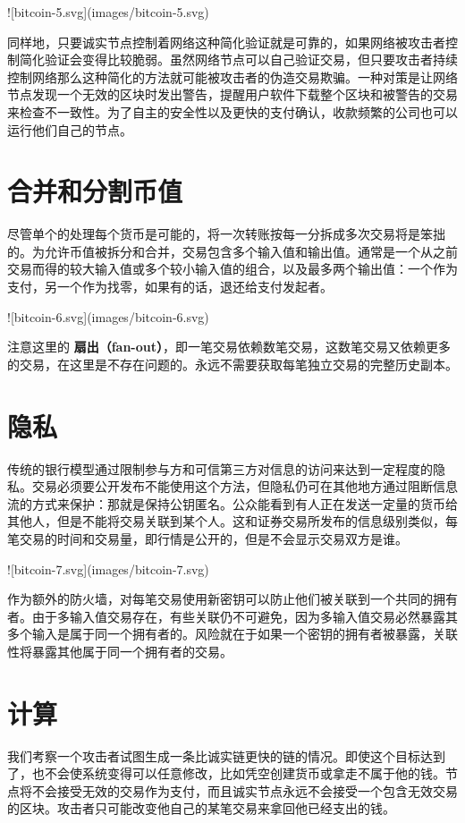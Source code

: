 \documentclass{article}
\begin{document}
![bitcoin-5.svg](images/bitcoin-5.svg)

同样地，只要诚实节点控制着网络这种简化验证就是可靠的，如果网络被攻击者控制简化验证会变得比较脆弱。虽然网络节点可以自己验证交易，但只要攻击者持续控制网络那么这种简化的方法就可能被攻击者的伪造交易欺骗。一种对策是让网络节点发现一个无效的区块时发出警告，提醒用户软件下载整个区块和被警告的交易来检查不一致性。为了自主的安全性以及更快的支付确认，收款频繁的公司也可以运行他们自己的节点。

\section{合并和分割币值}
尽管单个的处理每个货币是可能的，将一次转账按每一分拆成多次交易将是笨拙的。为允许币值被拆分和合并，交易包含多个输入值和输出值。通常是一个从之前交易而得的较大输入值或多个较小输入值的组合，以及最多两个输出值：一个作为支付，另一个作为找零，如果有的话，退还给支付发起者。

![bitcoin-6.svg](images/bitcoin-6.svg)

注意这里的 \textbf{扇出（fan-out）}，即一笔交易依赖数笔交易，这数笔交易又依赖更多的交易，在这里是不存在问题的。永远不需要获取每笔独立交易的完整历史副本。

\section{隐私}
传统的银行模型通过限制参与方和可信第三方对信息的访问来达到一定程度的隐私。交易必须要公开发布不能使用这个方法，但隐私仍可在其他地方通过阻断信息流的方式来保护：那就是保持公钥匿名。公众能看到有人正在发送一定量的货币给其他人，但是不能将交易关联到某个人。这和证券交易所发布的信息级别类似，每笔交易的时间和交易量，即行情是公开的，但是不会显示交易双方是谁。

![bitcoin-7.svg](images/bitcoin-7.svg)

作为额外的防火墙，对每笔交易使用新密钥可以防止他们被关联到一个共同的拥有者。由于多输入值交易存在，有些关联仍不可避免，因为多输入值交易必然暴露其多个输入是属于同一个拥有者的。风险就在于如果一个密钥的拥有者被暴露，关联性将暴露其他属于同一个拥有者的交易。

\section{计算}

我们考察一个攻击者试图生成一条比诚实链更快的链的情况。即使这个目标达到了，也不会使系统变得可以任意修改，比如凭空创建货币或拿走不属于他的钱。节点将不会接受无效的交易作为支付，而且诚实节点永远不会接受一个包含无效交易的区块。攻击者只可能改变他自己的某笔交易来拿回他已经支出的钱。
\end{document}

